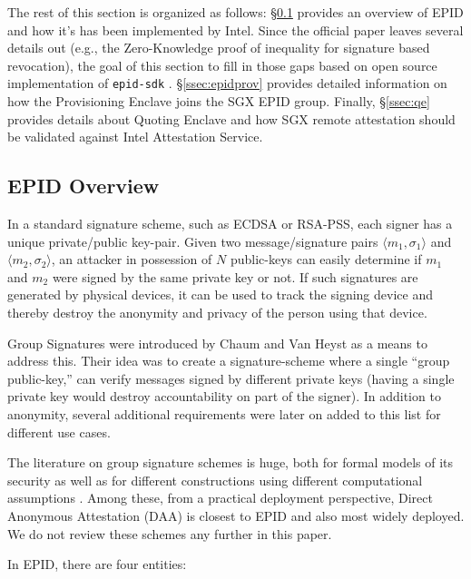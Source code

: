 \documentclass[letterpaper]{article}
\newcommand{\secref}[1]{\S\ref{#1}}
\begin{document}
  The rest of this section is organized as follows: \secref{ssec:epid}
  provides an overview of EPID and how it's has been implemented by
  Intel. Since the official \cite{epid} paper leaves several details
  out (e.g., the Zero-Knowledge proof of inequality for signature
  based revocation), the goal of this
  section to fill in those gaps based on open source implementation
  of \texttt{epid-sdk} \cite{epidsdk}. \secref{ssec:epidprov} provides detailed information
  on how the \textsf{Provisioning Enclave} joins the SGX EPID
  group. Finally, \secref{ssec:qe} provides details about
  \textsf{Quoting Enclave} and how SGX remote attestation should be
  validated against Intel Attestation Service.

  \subsection{EPID Overview}
  \label{ssec:epid}
  In a standard signature scheme, such as ECDSA or RSA-PSS, each
  signer has a unique private/public key-pair. Given two
  message/signature pairs $\langle m_1, \sigma_1 \rangle$ and $\langle
  m_2, \sigma_2 \rangle$, an attacker in possession of $N$ public-keys
  can easily determine if $m_1$ and $m_2$ were signed by the same
  private key or not. If such signatures are generated by physical
  devices, it can be used to track the signing device and thereby
  destroy the anonymity and privacy of the person using that device.

  Group Signatures were introduced by Chaum and Van Heyst
  \cite{ChaumGroupSignatures} as a means to address this. Their idea
  was to create a signature-scheme where a single ``group
  public-key,'' can verify messages signed by different private
  keys (having a single private key would destroy accountability 
  on part of the signer). In addition to anonymity, several additional 
  requirements were later on added to this list for different use cases.

  The literature on group signature schemes is huge, both for formal
  models of its security as well as for different constructions using different
  computational assumptions \cite{BMW03,dynamicGroupSignatures,
  fulldynamicgroupsignature, bbs, Furukawa2005, coalitionresistant, 
  camenischLysyankaya}. Among these, from a practical deployment
  perspective, Direct Anonymous Attestation \cite{daa, ucdaa} (DAA) is
  closest to EPID and also most widely deployed. We do not review these schemes any further in this paper.

  In EPID, there are four entities:
\end{document}
